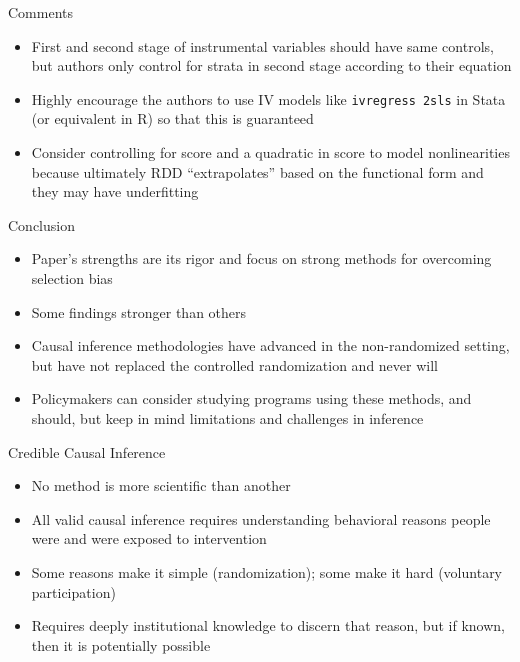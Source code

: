 \documentclass{beamer}
\begin{document}
\begin{frame}{Comments}

\begin{itemize}
\item First and second stage of instrumental variables should have same controls, but authors only control for strata in second stage according to their equation
\item Highly encourage the authors to use IV models like \texttt{ivregress 2sls} in Stata (or equivalent in R) so that this is guaranteed
\item Consider controlling for score and a quadratic in score to model nonlinearities because ultimately RDD ``extrapolates'' based on the functional form and they may have underfitting
\end{itemize}

\end{frame}


\begin{frame}{Conclusion}

\begin{itemize}
\item Paper's strengths are its rigor and focus on strong methods for overcoming selection bias
\item Some findings stronger than others
\item Causal inference methodologies have advanced in the non-randomized setting, but have not replaced the controlled randomization and never will
\item Policymakers can consider studying programs using these methods, and should, but keep in mind limitations and challenges in inference
\end{itemize}

\end{frame}

\begin{frame}{Credible Causal Inference}

\begin{itemize}

\item No method is more scientific than another
\item All valid causal inference requires understanding behavioral reasons people were and were exposed to intervention
\item Some reasons make it simple (randomization); some make it hard (voluntary participation)
\item Requires deeply institutional knowledge to discern that reason, but if known, then it is potentially possible

\end{itemize}

\end{frame}

\end{document}
